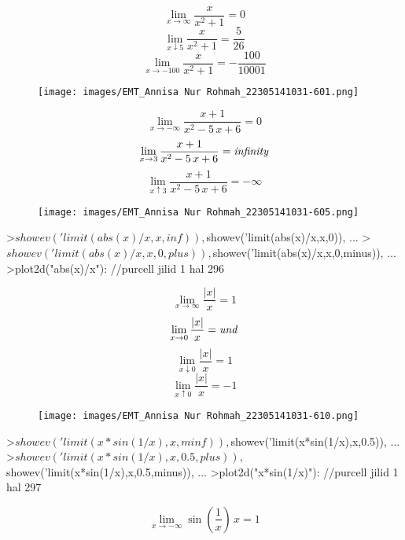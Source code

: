 \documentclass[a4paper,10pt]{article}
\begin{document}
\begin{eulernotebook}
\begin{eulerformula}
\[
\lim_{x\rightarrow \infty }{\frac{x}{x^2+1}}=0
\]
\[
\lim_{x\downarrow 5}{\frac{x}{x^2+1}}=\frac{5}{26}
\]
\[
\lim_{x\rightarrow -100}{\frac{x}{x^2+1}}=-\frac{100}{10001}
\]
\end{eulerformula}
\begin{figure}[h]
    \centering
    \texttt{[image: images/EMT\_Annisa Nur Rohmah\_22305141031-601.png]}
\end{figure}
\begin{eulerformula}
\[
\lim_{x\rightarrow  -\infty }{\frac{x+1}{x^2-5\,x+6}}=0
\]
\[
\lim_{x\rightarrow 3}{\frac{x+1}{x^2-5\,x+6}}={\it infinity}
\]
\[
\lim_{x\uparrow 3}{\frac{x+1}{x^2-5\,x+6}}= -\infty 
\]
\end{eulerformula}
\begin{figure}[h]
    \centering
    \texttt{[image: images/EMT\_Annisa Nur Rohmah\_22305141031-605.png]}
\end{figure}
\begin{eulerprompt}
>$showev('limit(abs(x)/x,x,inf)), $showev('limit(abs(x)/x,x,0)),  ...
>$showev('limit(abs(x)/x,x,0,plus)), $showev('limit(abs(x)/x,x,0,minus)), ...
>plot2d("abs(x)/x"): //purcell jilid 1 hal 296
\end{eulerprompt}
\begin{eulerformula}
\[
 \lim_{x\rightarrow \infty }{\frac{\left| x\right| }{x}}=1
\]
\[
 \lim_{x\rightarrow 0}{\frac{\left| x\right| }{x}}={\it und}
\]
\[
 \lim_{x\downarrow 0}{\frac{\left| x\right| }{x}}=1
\]
\[
\lim_{x\uparrow 0}{\frac{\left| x\right| }{x}}=-1
\]
\end{eulerformula}
\begin{figure}[h]
    \centering
    \texttt{[image: images/EMT\_Annisa Nur Rohmah\_22305141031-610.png]}
\end{figure}
\begin{eulerprompt}
>$showev('limit(x*sin(1/x),x,minf)), $showev('limit(x*sin(1/x),x,0.5)), ...
>$showev('limit(x*sin(1/x),x,0.5,plus)), $showev('limit(x*sin(1/x),x,0.5,minus)), ...
>plot2d("x*sin(1/x)"): //purcell jilid 1 hal 297
\end{eulerprompt}
\begin{eulerformula}
\[
 \lim_{x\rightarrow  -\infty }{\sin \left(\frac{1}{x}\right)\,x}=1
\]
\end{eulerformula}
\end{eulernotebook}
\end{document}
